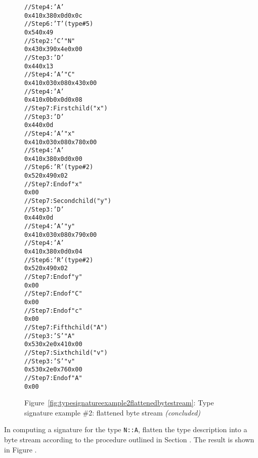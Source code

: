 \begin{figure}
\begin{dwflisting}
\begin{alltt}
    // Step 4: 'A' \DWATdatamemberlocation {}
    0x41 0x38 0x0d 0x0c
    // Step 6: 'T' \DWATtype (type \#5)
    0x54 0x49
        // Step 2: 'C' \DWTAGnamespace "N"
        0x43 0x39 0x4e 0x00
        // Step 3: 'D' \DWTAGstructuretype
        0x44 0x13
        // Step 4: 'A' \DWATname \DWFORMstring "C"
        0x41 0x03 0x08 0x43 0x00
        // Step 4: 'A' \DWATbytesize {}
        0x41 0x0b 0x0d 0x08
        // Step 7: First child ("x")
            // Step 3: 'D' \DWTAGmember
            0x44 0x0d
            // Step 4: 'A' \DWATname \DWFORMstring "x"
            0x41 0x03 0x08 0x78 0x00
            // Step 4: 'A' \DWATdatamemberlocation {}
            0x41 0x38 0x0d 0x00
            // Step 6: 'R' \DWATtype (type \#2)
            0x52 0x49 0x02
            // Step 7: End of \DWTAGmember "x"
            0x00
        // Step 7: Second child ("y")
            // Step 3: 'D' \DWTAGmember
            0x44 0x0d
            // Step 4: 'A' \DWATname \DWFORMstring "y"
            0x41 0x03 0x08 0x79 0x00
            // Step 4: 'A' \DWATdatamemberlocation {}
            0x41 0x38 0x0d 0x04
            // Step 6: 'R' \DWATtype (type \#2)
            0x52 0x49 0x02
            // Step 7: End of \DWTAGmember "y"
            0x00
        // Step 7: End of \DWTAGstructuretype "C"
        0x00
    // Step 7: End of \DWTAGmember "c"
    0x00
// Step 7: Fifth child ("A")
    // Step 3: 'S' \DWTAGsubprogram "A"
    0x53 0x2e 0x41 0x00
// Step 7: Sixth child ("v")
    // Step 3: 'S' \DWTAGsubprogram "v"
    0x53 0x2e 0x76 0x00
// Step 7: End of \DWTAGstructuretype "A"
0x00
\end{alltt}
\end{dwflisting}
\begin{center}
\vspace{3mm}
Figure~\ref{fig:typesignatureexample2flattenedbytestream}: Type signature example \#2: flattened byte stream \textit{(concluded)}
\end{center}
\end{figure}

In computing a signature for the type \texttt{N::A}, flatten the type
description into a byte stream according to the procedure
outlined in 
Section .
The result is shown in 
Figure .


